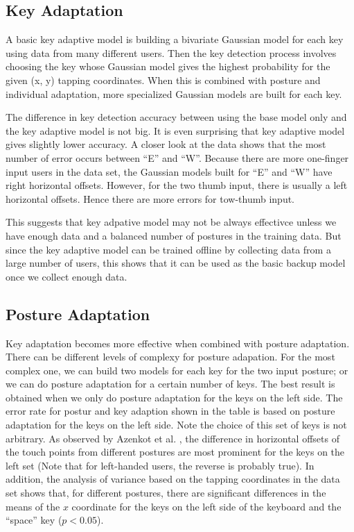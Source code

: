 \documentclass{sigchi}
\begin{document}
\subsection{Key Adaptation}
A basic key adaptive model is building a bivariate Gaussian model for each key 
using data from many different users. Then the key detection process involves 
choosing the key whose Gaussian model gives the highest probability for the 
given (x, y) tapping coordinates. When this is combined with posture and 
individual adaptation, more specialized Gaussian models are built for each key.

The difference in key detection accuracy between using the base model only and
the key adaptive model is not big. It is even surprising that key adaptive model
gives slightly lower accuracy. A closer look at the data shows that the most number of error occurs between
``E'' and ``W''. Because there are more one-finger input users in the data set, the 
Gaussian models built for ``E'' and ``W'' have right horizontal offsets. However, for the two thumb input, 
there is usually a left horizontal offsets. Hence there are more errors for tow-thumb input.

This suggests that key adpative model may not be always effectivce unless we have enough data and a balanced
number of postures in the training data. But since the key adaptive model can be trained offline by collecting data from a 
large number of users, this shows that it can be used as the basic backup model once we collect enough data. 

\subsection{Posture Adaptation}
Key adaptation becomes more effective when combined with posture adaptation. There can be different levels of
complexy for posture adapation. For the most complex one, we can build two models for each key for the 
two input posture; or we can do posture adaptation for a certain number of keys. The best result is obtained when we only do 
posture adaptation for the keys on the left side. The error rate for postur and key adaption shown in the table is 
based on posture adaptation for the keys on the left side. Note the choice of this set of keys
is not arbitrary. As observed by Azenkot et al. \cite{Azenkot:2012}, the difference in horizontal
offsets of the touch points from different postures are most prominent for the keys on the
left set (Note that for left-handed users, the reverse is probably true). 
In addition, the analysis of variance based on the tapping coordinates in the data set shows
that, for different postures, there are significant differences in the means of
the $x$ coordinate for the keys on the left side of the keyboard and the
``space'' key ($p < 0.05$). 
\end{document}
